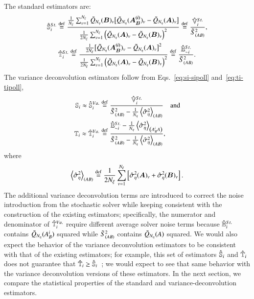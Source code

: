 The standard estimators are:
\begin{gather} \label{eq:saltelli-si-poll}
    \hat{\mathbb{S}}_{i}^{St.} \overset{\operatorname{def}}{=} \frac{\frac{1}{{N_\xi}} \sum_{v=1}^{{N_\xi}} \tilde{Q}_{{N_\eta}}(\bm{B})_v \bigl[ \tilde{Q}_{{N_\eta}}(\bm{A_B^{(i)}})_v - \tilde{Q}_{{N_\eta}}(\bm{A})_v \bigr]}{\frac{1}{2{N_\xi}} \sum_{v=1}^{{N_\xi}} \left( \tilde{Q}_{{N_\eta}}(\bm{A})_v - \tilde{Q}_{{N_\eta}}(\bm{B})_v \right)^2} \overset{\operatorname{def}}{=} \frac{\hat{\mathbb{V}}_{i}^{St.}}{\tilde{S}^2_{\left( AB \right)}}, \\ \label{eq:saltelli-ti-poll}
    \hat{\mathbb{T}}_{i}^{St.} \overset{\operatorname{def}}{=} \frac{ \frac{1}{2{N_\xi}} \bigl[ \tilde{Q}_{{N_\eta}}(\bm{A_B^{(i)}})_v - \tilde{Q}_{{N_\eta}}(\bm{A})_v \bigr]^2}{\frac{1}{2{N_\xi}} \sum_{v=1}^{{N_\xi}} \left( \tilde{Q}_{{N_\eta}}(\bm{A})_v - \tilde{Q}_{{N_\eta}}(\bm{B})_v \right)^2} \overset{\operatorname{def}}{=} \frac{\hat{\mathbb{E}}_{{\sim i}}^{St.}}{\tilde{S}^2_{\left( AB \right)}}.
\end{gather}
The variance deconvolution estimators follow from Eqs.~\eqref{eq:si-sipoll} and~\eqref{eq:ti-tipoll},
\begin{align} \label{eq:saltelli-si-vard}
    \mathbb{S}_{i} \approx \hat{\mathbb{S}}_{i}^{Va.} &\overset{\operatorname{def}}{=} \frac{\hat{\mathbb{V}}_{i}^{St.}}{\tilde{S}^2_{\left( AB \right)} - \frac{1}{{N_\eta}}\left< \hat{\sigma}^2_\eta \right>_{\left(AB \right)}} \quad \text{and} \\ \label{eq:saltelli-ti-vard}
    \mathbb{T}_{i} \approx \hat{\mathbb{T}}_{i}^{Va.} &\overset{\operatorname{def}}{=} \frac{\hat{\mathbb{E}}_{{\sim i}}^{St.} -{\frac{1}{{N_\eta}} \left< \hat{\sigma}^2_\eta \right>_{\left(A_B^i A \right)}}}{\tilde{S}^2_{\left( AB \right)} - \frac{1}{{N_\eta}} \left< \hat{\sigma}^2_\eta \right>_{\left(AB \right)}} ,
\end{align}
where 
\begin{equation}
    \left< \hat{\sigma}^2_\eta \right>_{\left(AB \right)} \overset{\operatorname{def}}{=} \frac{1}{2{N_\xi}} \sum_{v=1}^{{N_\xi}} \left[ \hat{\sigma}^2_\eta(\bm{A})_v + \hat{\sigma}^2_\eta(\bm{B})_v \right].
\end{equation}
The additional variance deconvolution terms are introduced to correct the noise introduction from the stochastic solver while keeping consistent with the construction of the existing estimators; specifically, the numerator and denominator of $\hat{\mathbb{T}}_{i}^{Va.}$ require different average solver noise terms because $\hat{\mathbb{E}}_{i}^{St.}$ contains $\tilde{Q}_{{N_\eta}}(A_B^i)$ squared while $\tilde{S}^2_{\left( AB \right)}$ contains $\tilde{Q}_{{N_\eta}}(A)$ squared.
We would also expect the behavior of the variance deconvolution estimators to be consistent with that of the existing estimators; for example, this set of estimators $\hat{\mathbb{S}}_{i}$ and $\hat{\mathbb{T}}_{i}$ does not guarantee that $\hat{\mathbb{T}}_{i} \geq \hat{\mathbb{S}}_{i}$~\cite{azzini-etal-2021}; we would expect to see that same behavior with the variance deconvolution versions of these estimators.
In the next section, we compare the statistical properties of the standard and variance-deconvolution estimators.

